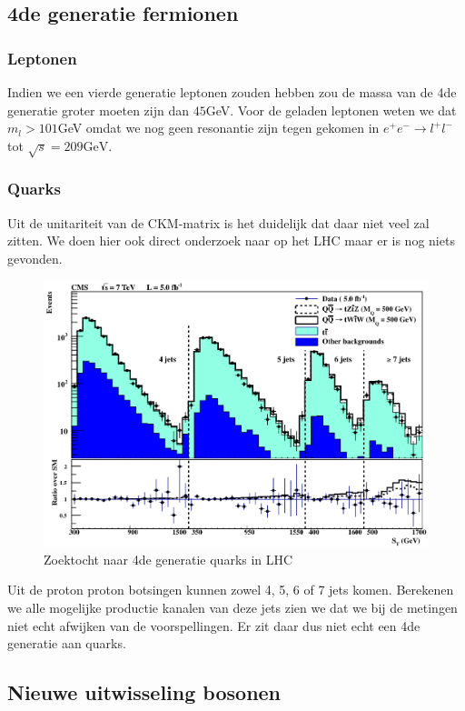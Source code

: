 \documentclass[../main.tex]{subfiles}
\begin{document}
\subsection{4de generatie fermionen}%
\label{sub:4de_generatie_fermionen}

\subsubsection{Leptonen}%
\label{ssub:leptonen}

Indien we een vierde generatie leptonen zouden hebben zou de massa van de 4de generatie groter moeten zijn dan $45$GeV. Voor de geladen leptonen weten we dat $m_l > 101$GeV omdat we nog geen resonantie zijn tegen gekomen in $e^{+} e^{-} \rightarrow l^{+} l^{-}$ tot $\sqrt{s}=209 \mathrm{GeV}$.

\subsubsection{Quarks}%
\label{ssub:quarks}

Uit de unitariteit van de CKM-matrix is het duidelijk dat daar niet veel zal zitten. We doen hier ook direct onderzoek naar op het LHC maar er is nog niets gevonden.

\begin{figure}[h]
    \centering
    \includegraphics[width=0.6\linewidth]{physics_beyond_the_standard_model/lhc_4_gen_zoektocht.png}
    \caption{Zoektocht naar 4de generatie quarks in LHC}%
    \label{fig:physics_beyond_the_standard_model/lhc_4_gen_zoektocht}
\end{figure}

Uit de proton proton botsingen kunnen zowel 4, 5, 6 of 7 jets komen. Berekenen we alle mogelijke productie kanalen van deze jets zien we dat we bij de metingen niet echt afwijken van de voorspellingen. Er zit daar dus niet echt een 4de generatie aan quarks.

\subsection{Nieuwe uitwisseling bosonen}%
\label{sub:nieuwe_uitwisselings_bosonen}
\end{document}
